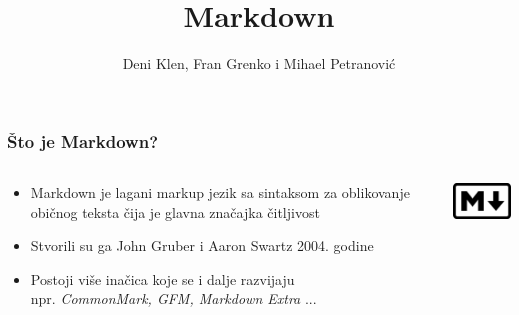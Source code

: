 \documentclass{beamer}
\begin{document}
\title{Markdown}
\author{Deni Klen, Fran Grenko i Mihael Petranović}
\maketitle





\begin{frame}
	\frametitle{Što je Markdown?}

 	\begin{minipage}[0.2\textheight]{\textwidth}
 	\begin{columns}[T]
 	\begin{column}{0.8\textwidth}
 	\begin{itemize}
		\item{Markdown je lagani markup jezik sa sintaksom za oblikovanje običnog teksta čija je glavna značajka čitljivost}
		\item{Stvorili su ga John Gruber i Aaron Swartz 2004. godine}
		\item{Postoji više inačica koje se i dalje razvijaju \\ npr. \textit{CommonMark, GFM, Markdown Extra} ...}
	\end{itemize}
	\end{column}
	\begin{column}{0.2\textwidth}
	\includegraphics[width=2.5cm]{Slike/markdown.png}
	\end{column}
	\end{columns}
	\end{minipage}

\end{frame}
\end{document}
